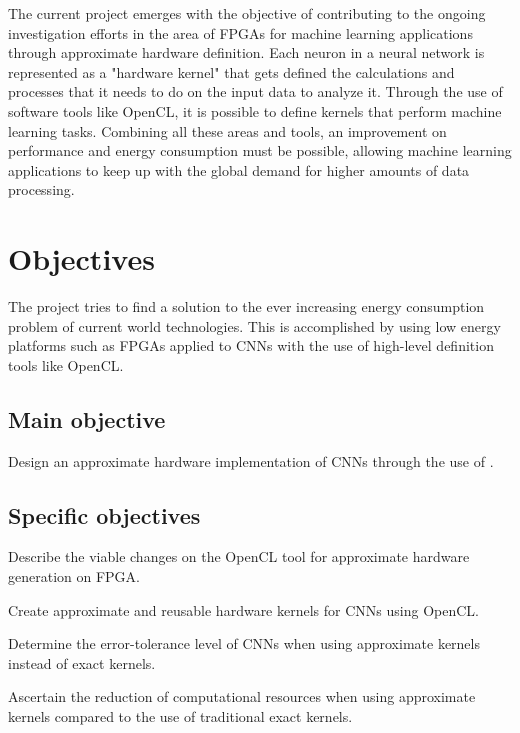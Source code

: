 The current project emerges with the objective of contributing to the ongoing investigation efforts
in the area of FPGAs for machine learning applications through approximate hardware definition.
Each neuron in a neural network is represented as a "hardware kernel" that gets defined the 
calculations and processes that it needs to do on the input data to analyze it.
Through the use of software tools like OpenCL, it is possible to define kernels that perform
machine learning tasks. Combining all these areas and tools, an improvement on performance and
energy consumption must be possible, allowing machine learning applications to keep up
with the global demand for higher amounts of data processing.


\section{Objectives}

The project tries to find a solution to the ever increasing energy consumption problem
of current world technologies. This is accomplished by using low energy platforms such as
FPGAs applied to CNNs with the use of high-level definition tools like OpenCL.

\subsection{Main objective}

Design an approximate hardware implementation of CNNs through the 
use of \intelOCL.

\subsection{Specific objectives}

\begin{compactitem}
    \item Describe the viable changes on the OpenCL tool for approximate hardware generation on FPGA.
    \item Create approximate and reusable hardware kernels for CNNs using OpenCL.
    \item Determine the error-tolerance level of CNNs when using approximate kernels instead of exact kernels.
    \item Ascertain the reduction of computational resources when using approximate kernels compared to the use of traditional exact kernels.
\end{compactitem}

